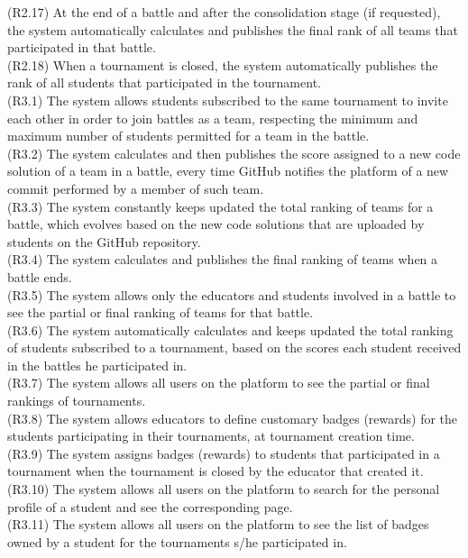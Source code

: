 (R2.17) At the end of a battle and after the consolidation stage (if requested), the system automatically calculates and publishes the final rank of all teams that participated in that battle.  \\
(R2.18) When a tournament is closed, the system automatically publishes the rank of all students that participated in the tournament. \\
(R3.1) The system allows students subscribed to the same tournament to invite each other in order to join battles as a team, respecting the minimum and maximum number of students permitted for a team in the battle. \\
(R3.2) The system calculates and then publishes the score assigned to a new code solution of a team in a battle, every time GitHub notifies the platform of a new commit performed by a member of such team. \\
(R3.3) The system constantly keeps updated the total ranking of teams for a battle, which evolves based on the new code solutions that are uploaded by students on the GitHub repository. \\
(R3.4) The system calculates and publishes the final ranking of teams when a battle ends. \\
(R3.5) The system allows only the educators and students involved in a battle to see the partial or final ranking of teams for that battle. \\
(R3.6) The system automatically calculates and keeps updated the total ranking of students subscribed to a tournament, based on the scores each student received in the battles he participated in. \\
(R3.7) The system allows all users on the platform to see the partial or final rankings of tournaments. \\
(R3.8)  The system allows educators to define customary badges (rewards) for the students participating in their tournaments, at tournament creation time. \\
(R3.9) The system assigns badges (rewards) to students that participated in a tournament when the tournament is closed by the educator that created it. \\
(R3.10) The system allows all users on the platform to search for the personal profile of a student and see the corresponding page. \\
(R3.11) The system allows all users on the platform to see the list of badges owned by a student for the tournaments s/he participated in. \\